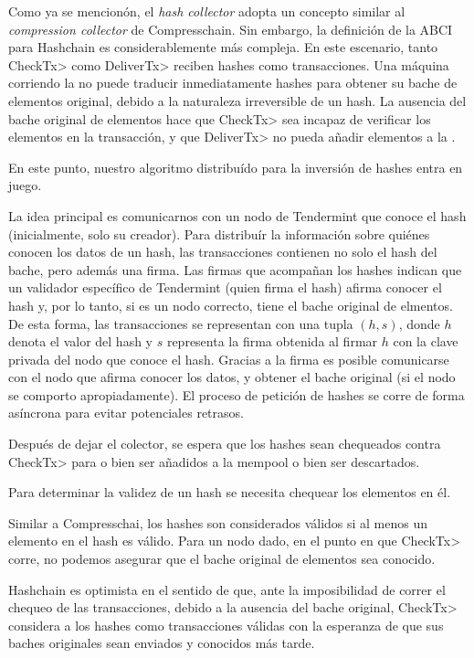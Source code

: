 Como ya se mencionón, el \textit{hash collector} adopta un concepto similar al \textit{compression collector}
de Compresschain. Sin embargo, la definición de la ABCI para Hashchain es considerablemente más compleja.
%
En este escenario, tanto \<CheckTx> como \<DeliverTx> reciben hashes como transacciones.
%
Una máquina corriendo la \setchain no puede traducir inmediatamente hashes para obtener su bache de elementos
original, debido a la naturaleza irreversible de un hash.
%
La ausencia del bache original de elementos hace que \<CheckTx> sea incapaz de verificar los elementos
en la transacción, y que \<DeliverTx> no pueda añadir elementos a la \setchain.
%

En este punto, nuestro algoritmo distribuído para la inversión de hashes entra en juego.
%

La idea principal es comunicarnos con un nodo de Tendermint que conoce el hash (inicialmente, solo su creador).
%
Para distribuír la información sobre quiénes conocen los datos de un hash, las transacciones contienen
no solo el hash del bache, pero además una firma.
%
Las firmas que acompañan los hashes indican que un validador específico de Tendermint
(quien firma el hash) afirma conocer el hash y, por lo tanto, si es un nodo correcto,
tiene el bache original de elmentos.
%
De esta forma, las transacciones se representan con una tupla $(h, s)$, donde $h$ denota
el valor del hash y $s$ representa la firma obtenida al firmar $h$ con la clave privada
del nodo que conoce el hash.
%
Gracias a la firma es posible comunicarse con el nodo que afirma conocer los datos, y obtener
el bache original (si el nodo se comporto apropiadamente).
%
El proceso de petición de hashes se corre de forma asíncrona para evitar potenciales
retrasos.

%
Después de dejar el colector, se espera que los hashes sean chequeados contra \<CheckTx>
para o bien ser añadidos a la mempool o bien ser descartados.

%
Para determinar la validez de un hash se necesita chequear los elementos en él.

%
Similar a Compresschai, los hashes son considerados válidos si al menos un elemento
en el hash es válido.
%
Para un nodo dado, en el punto en que \<CheckTx> corre, no podemos asegurar que el
bache original de elementos sea conocido.

%
Hashchain es optimista en el sentido de que, ante la imposibilidad de correr el chequeo
de las transacciones, debido a la ausencia del bache original, \<CheckTx> considera a los
hashes como transacciones válidas con la esperanza de que sus baches originales sean enviados
y conocidos más tarde. 

